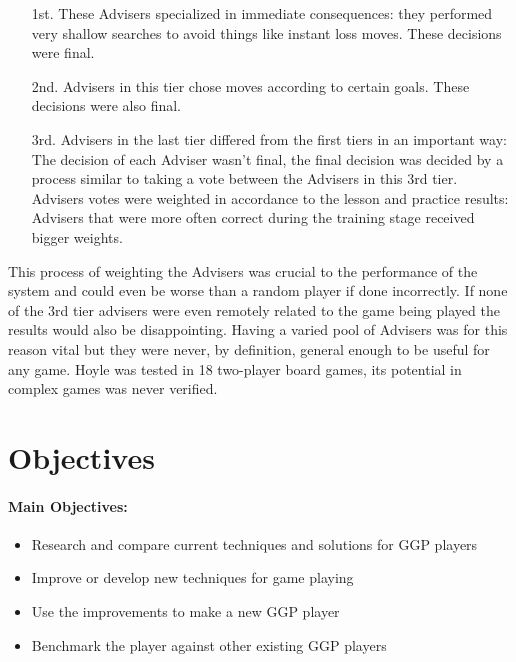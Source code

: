 \begin{enumerate}

\item [1st.] These Advisers specialized in immediate consequences: they performed very shallow searches to avoid things like instant loss moves. These decisions were final.

\item [2nd.] Advisers in this tier chose moves according to certain goals. These decisions were also final.

\item [3rd.] Advisers in the last tier differed from the first tiers in an important way: The decision of each Adviser wasn’t final, the final decision was decided by a process similar to taking a vote between the Advisers in this 3rd tier. Advisers votes were weighted in accordance to the lesson and practice results: Advisers that were more often correct during the training stage received bigger weights.

\end{enumerate}
This process of weighting the Advisers was crucial to the performance of the system and could even be worse than a random player if done incorrectly. If none of the 3rd tier advisers were even remotely related to the game being played the results would also be disappointing. Having a varied pool of Advisers was for this reason vital but they were never, by definition, general enough to be useful for any game. Hoyle was tested in 18 two-player board games, its potential in complex games was never verified.


\section{Objectives}

\paragraph{Main Objectives:}
\begin{itemize}
\item Research and compare current techniques and solutions for GGP players
\item Improve or develop new techniques for game playing
\item Use the improvements to make a new GGP player
\item Benchmark the player against other existing GGP players
\end{itemize}

